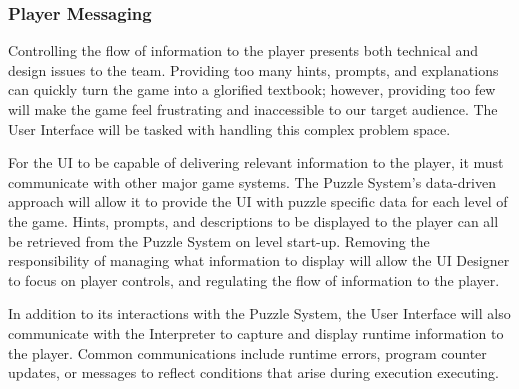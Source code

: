\subsubsection{Player Messaging}

Controlling the flow of information to the player presents both technical and design issues to the team. Providing too many hints, prompts, and explanations can quickly turn the game into a glorified textbook; however, providing too few will make the game feel frustrating and inaccessible to our target audience. The User Interface will be tasked with handling this complex problem space.   

For the UI to be capable of delivering relevant information to the player, it must communicate with other major game systems. The Puzzle System's data-driven approach will allow it to provide the UI with puzzle specific data for each level of the game. Hints, prompts, and descriptions to be displayed to the player can all be retrieved from the Puzzle System on level start-up. Removing the responsibility of managing what information to display will allow the UI Designer to focus on player controls, and regulating the flow of information to the player.

In addition to its interactions with the Puzzle System, the User Interface will also communicate with the Interpreter to capture and display runtime information to the player. Common communications include runtime errors, program counter updates, or messages to reflect conditions that arise during execution executing.
